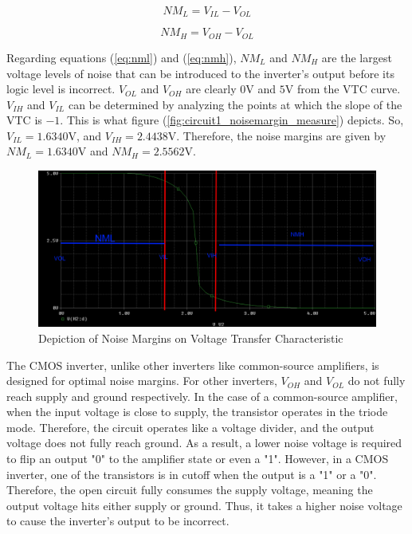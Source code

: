 \begin{equation}
	\label{eq:nml}
	NM_{L} = V_{IL} - V_{OL}
\end{equation}

\begin{equation}
	\label{eq:nmh}
	NM_{H} = V_{OH} - V_{OL}
\end{equation}

Regarding equations (\ref{eq:nml}) and (\ref{eq:nmh}), $NM_{L}$ and $NM_{H}$ are the largest voltage levels of noise that can be introduced to the inverter's output before its logic level is incorrect. $V_{OL}$ and $V_{OH}$ are clearly $0$\si{\volt} and $5$\si{\volt} from the VTC curve. $V_{IH}$ and $V_{IL}$ can be determined by analyzing the points at which the slope of the VTC is $-1$. This is what figure (\ref{fig:circuit1_noisemargin_measure}) depicts. So, $V_{IL} = 1.6340$\si{\volt}, and $V_{IH} = 2.4438$\si{\volt}. Therefore, the noise margins are given by $NM_{L} = 1.6340$\si{\volt} and $NM_{H} = 2.5562$\si{\volt}. \\

\FloatBarrier

\begin{figure}[h!]
	\centering
	\includegraphics[scale=0.25]{./images/circuit1_noisemargin.PNG}
	\caption{Depiction of Noise Margins on Voltage Transfer Characteristic}
	\label{fig:circuit1_noisemargin}
\end{figure}

\FloatBarrier

The CMOS inverter, unlike other inverters like common-source amplifiers, is designed for optimal noise margins. For other inverters, $V_{OH}$ and $V_{OL}$ do not fully reach supply and ground respectively. In the case of a common-source amplifier, when the input voltage is close to supply, the transistor operates in the triode mode. Therefore, the circuit operates like a voltage divider, and the output voltage does not fully reach ground. As a result, a lower noise voltage is required to flip an output "0" to the amplifier state or even a "1". However, in a CMOS inverter, one of the transistors is in cutoff when the output is a "1" or a "0". Therefore, the open circuit fully consumes the supply voltage, meaning the output voltage hits either supply or ground. Thus, it takes a higher noise voltage to cause the inverter's output to be incorrect. \\


